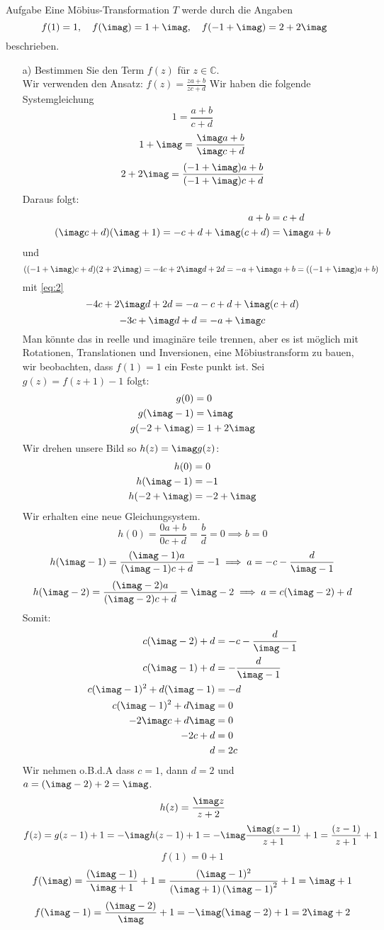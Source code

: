 \documentclass{scrartcl}
\def\mbb#1{\mathbb{#1}}
\def\bC{\mbb{C}}
\begin{document}
\begin{section}{Aufgabe}%
Eine Möbius-Transformation $T$ werde durch die Angaben
\[f(1)=1,\quad f(\imag)=1+\imag,\quad f(-1+\imag)=2+2\imag\]
beschrieben.
\begin{itemize}
\item[a)]
Bestimmen Sie den Term $f(z)$ für $z \in \bC$.\\
Wir verwenden den Ansatz: \(f(z)=\frac{z a+b}{z c+d}\)
Wir haben die folgende Systemgleichung
\[1=\frac{a+b}{c+d}\]
\[1+\imag=\frac{\imag a+b}{\imag c+d}\]
\[2+2\imag=\frac{(-1+\imag)a+b}{(-1+\imag)c+d}\]
Daraus folgt:
\begin{align}
    a+b&=c+d \label{eq:1}\\
    (\imag c+d)(\imag+1)=-c+d+\imag(c+d)&=\imag a+b\label{eq:2}
\end{align}
und
\[((-1+\imag)c+d)(2+2\imag)=-4 c+2 \imag d+2 d=-a+ \imag a +b=((-1+\imag)a+b)\]
mit \eqref{eq:2}
\[-4 c+2 \imag d+2 d=-a -c+d+\imag(c+d)\]
\[-3 c+ \imag d+ d=-a +\imag c\]
Man könnte das in reelle und imaginäre teile trennen, aber es ist möglich mit Rotationen, Translationen und Inversionen, eine Möbiustransform zu bauen, wir beobachten, dass $f(1)=1$ ein Feste punkt ist.
Sei $g(z)=f(z+1)-1$ folgt:
\begin{align*}
g(0)&=0    \\
g(\imag-1)&=\imag \\
g(-2+\imag)&=1+2\imag
\end{align*}
Wir drehen unsere Bild so $h(z)=\imag g(z)$:
\begin{align*}
h(0)&=0    \\
h(\imag-1)&=-1 \\
h(-2+\imag)&=-2+\imag
\end{align*}
Wir erhalten eine neue Gleichungsystem.
\[h(0)=\frac{0 a+b}{0 c+d}=\frac{b}{d}=0\implies b=0\]
\[h(\imag-1)=\frac{(\imag-1)a}{(\imag-1) c+d}=-1\implies a=-c-\frac{d}{\imag-1}\]
\[h(\imag-2)=\frac{(\imag-2)a}{(\imag-2) c+d}=\imag-2\implies a=c(\imag-2)+d\]
Somit:
\begin{align*}
c(\imag-2)+d&=-c-\frac{d}{\imag-1}   \\
c(\imag-1)+d&=-\frac{d}{\imag-1}\\
c(\imag-1)^2+d(\imag-1)&=-d\\
c(\imag-1)^2+d \imag&=0\\
-2 \imag c+d \imag&=0\\
-2 c+d &=0\\
d &=2c
\end{align*}
Wir nehmen o.B.d.A dass $c=1$,
dann $d=2$ und $a=(\imag-2)+2=\imag$.
\[h(z)=\frac{\imag z}{z+2}\]
\[f(z)=g(z-1)+1=-\imag h(z-1)+1=-\imag \frac{\imag (z-1)}{z+1}+1= \frac{(z-1)}{z+1}+1\]
\[f(1)=0+1\]
\[f(\imag)=\frac{(\imag-1)}{\imag+1}+1=\frac{(\imag-1)^2}{\left(\imag+1\right)\left(\imag-1\right)^2}+1=\imag+1\]
\[f(\imag-1)=\frac{(\imag-2)}{\imag}+1=-\imag(\imag-2)+1=2\imag+2\]


\end{itemize}
\end{section}
\end{document}
